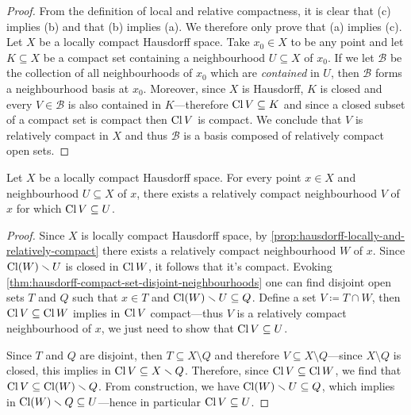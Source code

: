 \begin{proof}
From the definition of local and relative compactness, it is clear that (c)
implies (b) and that (b) implies (a). We therefore only prove that (a) implies
(c). Let \(X\) be a locally compact Hausdorff space. Take \(x_0 \in X\) to be
any point and let \(K \subseteq X\) be a compact set containing a neighbourhood
\(U \subseteq X\) of \(x_0\). If we let \(\mathcal{B}\) be the collection of all
neighbourhoods of \(x_0\) which are \emph{contained} in \(U\), then
\(\mathcal{B}\) forms a neighbourhood basis at \(x_0\). Moreover, since \(X\) is
Hausdorff, \(K\) is closed and every \(V \in \mathcal{B}\) is also contained in
\(K\)---therefore \(\operatorname{Cl} V \subseteq K\) and since a closed subset of a compact
set is compact then \(\operatorname{Cl} V\) is compact. We conclude that \(V\) is relatively
compact in \(X\) and thus \(\mathcal{B}\) is a basis composed of relatively
compact open sets.
\end{proof}


\begin{lemma}
\label{lem:loc-cpct-haus-rel-cpct-nbhd}
Let \(X\) be a locally compact Hausdorff space. For every point \(x \in X\) and
neighbourhood \(U \subseteq X\) of \(x\), there exists a relatively compact
neighbourhood \(V\) of \(x\) for which \(\operatorname{Cl} V \subseteq U\).
\end{lemma}

\begin{proof}
Since \(X\) is locally compact Hausdorff space, by
\cref{prop:hausdorff-locally-and-relatively-compact} there exists a relatively
compact neighbourhood \(W\) of \(x\). Since \(\operatorname{Cl}(W) \smallsetminus U\) is closed in
\(\operatorname{Cl} W\), it follows that it's compact. Evoking
\cref{thm:hausdorff-compact-set-disjoint-neighbourhoods} one can find disjoint
open sets \(T\) and \(Q\) such that \(x \in T\) and
\(\operatorname{Cl}(W) \smallsetminus U \subseteq Q\). Define a set \(V \coloneq T \cap W\), then
\(\operatorname{Cl} V \subseteq \operatorname{Cl} W\) implies in \(\operatorname{Cl} V\) compact---thus \(V\) is a
relatively compact neighbourhood of \(x\), we just need to show that
\(\operatorname{Cl} V \subseteq U\).

Since \(T\) and \(Q\) are disjoint, then \(T \subseteq X \setminus Q\) and
therefore \(V \subseteq X \setminus Q\)---since \(X \setminus Q\) is closed,
this implies in \(\operatorname{Cl} V \subseteq X \smallsetminus Q\). Therefore, since
\(\operatorname{Cl} V \subseteq \operatorname{Cl} W\), we find that \(\operatorname{Cl} V \subseteq \operatorname{Cl}(W) \smallsetminus
Q\). From construction, we have \(\operatorname{Cl}(W) \smallsetminus U \subseteq Q\), which
implies in \(\operatorname{Cl}(W) \smallsetminus Q \subseteq U\)---hence in particular
\(\operatorname{Cl} V \subseteq U\).
\end{proof}

